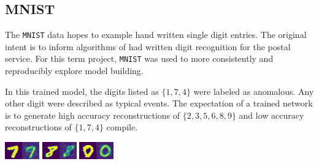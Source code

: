 \documentclass{article}
\begin{document}
\begin{multicols}{2}
\subsection{MNIST}
\def\mnist{\texttt{MNIST}\xspace}

The \mnist data hopes to example hand written single digit entries. The
original intent is to inform algorithms of had written digit recognition for the postal
service. For this term project, \mnist was used to more consistently and reproducibly
explore model building.

In this trained model, the digits listed as $\{1, 7, 4\}$ were labeled as anomalous. Any other
digit were described as typical events. The expectation of a trained network is to
generate high accuracy reconstructions of $\{2,3,5,6,8,9\}$ and low accuracy reconstructions of
$\{1, 7, 4\}$ compile.

\begin{multicols}{3}
\includegraphics[width=\columnwidth]{./vae-images/C.png}
\includegraphics[width=\columnwidth]{./vae-images/E.png}
\includegraphics[width=\columnwidth]{./vae-images/I.png}
\end{multicols}


\end{multicols}
\end{document}
